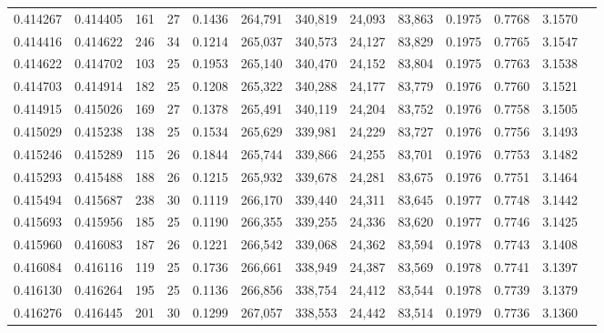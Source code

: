 \begin{tabular}{rrrrrrrrrrrrr}
0.414267 & 0.414405 &   161 &  27 &                                     0.1436 & 264,791 & 340,819 &  24,093 &  83,863 & 0.1975 & 0.7768 & 3.1570 \\
0.414416 & 0.414622 &   246 &  34 &                                     0.1214 & 265,037 & 340,573 &  24,127 &  83,829 & 0.1975 & 0.7765 & 3.1547 \\
0.414622 & 0.414702 &   103 &  25 &                                     0.1953 & 265,140 & 340,470 &  24,152 &  83,804 & 0.1975 & 0.7763 & 3.1538 \\
0.414703 & 0.414914 &   182 &  25 &                                     0.1208 & 265,322 & 340,288 &  24,177 &  83,779 & 0.1976 & 0.7760 & 3.1521 \\
0.414915 & 0.415026 &   169 &  27 &                                     0.1378 & 265,491 & 340,119 &  24,204 &  83,752 & 0.1976 & 0.7758 & 3.1505 \\
0.415029 & 0.415238 &   138 &  25 &                                     0.1534 & 265,629 & 339,981 &  24,229 &  83,727 & 0.1976 & 0.7756 & 3.1493 \\
0.415246 & 0.415289 &   115 &  26 &                                     0.1844 & 265,744 & 339,866 &  24,255 &  83,701 & 0.1976 & 0.7753 & 3.1482 \\
0.415293 & 0.415488 &   188 &  26 &                                     0.1215 & 265,932 & 339,678 &  24,281 &  83,675 & 0.1976 & 0.7751 & 3.1464 \\
0.415494 & 0.415687 &   238 &  30 &                                     0.1119 & 266,170 & 339,440 &  24,311 &  83,645 & 0.1977 & 0.7748 & 3.1442 \\
0.415693 & 0.415956 &   185 &  25 &                                     0.1190 & 266,355 & 339,255 &  24,336 &  83,620 & 0.1977 & 0.7746 & 3.1425 \\
0.415960 & 0.416083 &   187 &  26 &                                     0.1221 & 266,542 & 339,068 &  24,362 &  83,594 & 0.1978 & 0.7743 & 3.1408 \\
0.416084 & 0.416116 &   119 &  25 &                                     0.1736 & 266,661 & 338,949 &  24,387 &  83,569 & 0.1978 & 0.7741 & 3.1397 \\
0.416130 & 0.416264 &   195 &  25 &                                     0.1136 & 266,856 & 338,754 &  24,412 &  83,544 & 0.1978 & 0.7739 & 3.1379 \\
0.416276 & 0.416445 &   201 &  30 &                                     0.1299 & 267,057 & 338,553 &  24,442 &  83,514 & 0.1979 & 0.7736 & 3.1360 \\

\end{tabular}
